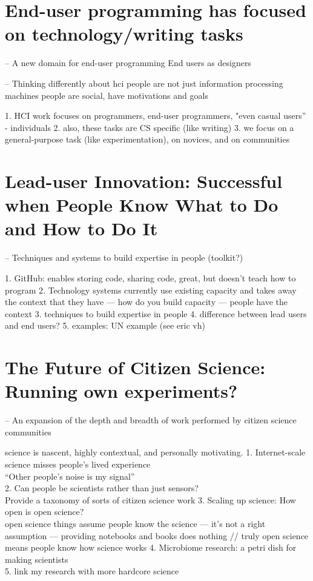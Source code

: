 \section{End-user programming has focused on technology/writing tasks}
-- A new domain for end-user programming 
End users as designers

-- Thinking differently about hci 
  people are not just information processing machines
  people are social, have motivations and goals

1. HCI work focuses on programmers, end-user programmers, "even casual users” - individuals
2. also, these tasks are CS specific (like writing)
3. we focus on a general-purpose task (like experimentation), on novices, and on communities


\section{Lead-user Innovation: Successful when People Know What to Do and How to Do It}
-- Techniques and systems to build expertise in people (toolkit?)

1. GitHub: enables storing code, sharing code, great, but doesn’t teach how to program
2. Technology systems currently use existing capacity and takes away the context that they have — how do you build capacity — people have the context 
3. techniques to build expertise in people
4. difference between lead users and end users? 
5. examples: UN example (see eric vh)

\section{The Future of Citizen Science: Running own experiments?}
-- An expansion of the depth and breadth of work performed by citizen science communities

science is nascent, highly contextual, and personally motivating.
1. Internet-scale science misses people’s lived experience \\
 “Other people’s noise is my signal” \\
2. Can people be scientists rather than just sensors? \\
 Provide a taxonomy of sorts of citizen science work
3. Scaling up science: How open is open science? \\
 open science things assume people know the science — it’s not a right assumption — providing notebooks and books does nothing // truly open science means people know how science works
4. Microbiome research: a petri dish for making scientists \\
5. link my research with more hardcore science

